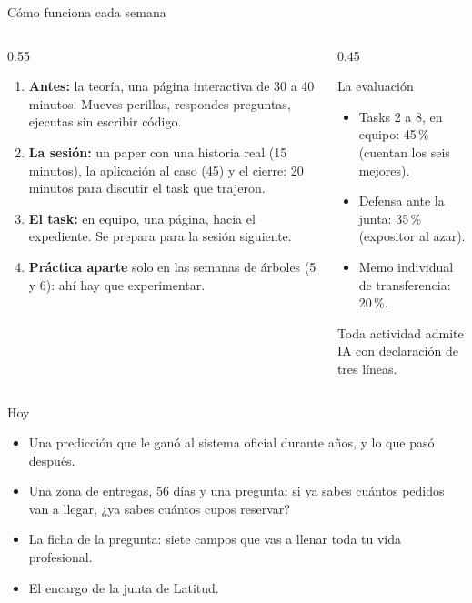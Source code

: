 \documentclass{beamer}
\begin{document}
\begin{frame}{Cómo funciona cada semana}
\small
\begin{columns}[T]
\begin{column}{0.55\textwidth}
\begin{enumerate}
  \item \textbf{Antes:} la teoría, una página interactiva de 30 a 40 minutos. Mueves perillas, respondes preguntas, ejecutas sin escribir código.
  \item \textbf{La sesión:} un paper con una historia real (15 minutos), la aplicación al caso (45) y el cierre: 20 minutos para discutir el task que trajeron.
  \item \textbf{El task:} en equipo, una página, hacia el expediente. Se prepara para la sesión siguiente.
  \item \textbf{Práctica aparte} solo en las semanas de árboles (5 y 6): ahí hay que experimentar.
\end{enumerate}
\end{column}
\begin{column}{0.45\textwidth}
\begin{block}{La evaluación}
\begin{itemize}
  \item Tasks 2 a 8, en equipo: 45\,\% (cuentan los seis mejores).
  \item Defensa ante la junta: 35\,\% (expositor al azar).
  \item Memo individual de transferencia: 20\,\%.
\end{itemize}
Toda actividad admite IA con declaración de tres líneas.
\end{block}
\end{column}
\end{columns}
\end{frame}

\begin{frame}{Hoy}
\begin{itemize}\itemsep8pt
  \item Una predicción que le ganó al sistema oficial durante años, y lo que pasó después.
  \item Una zona de entregas, 56 días y una pregunta: si ya sabes cuántos pedidos van a llegar, ¿ya sabes cuántos cupos reservar?
  \item La ficha de la pregunta: siete campos que vas a llenar toda tu vida profesional.
  \item El encargo de la junta de Latitud.
\end{itemize}
\end{frame}
\end{document}
